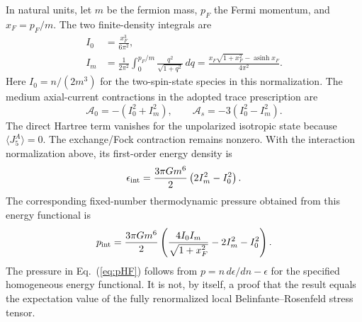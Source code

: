 \documentclass[11pt]{article}
\begin{document}
In natural units, let $m$ be the fermion mass, $p_F$ the Fermi momentum, and $x_F=p_F/m$. The two finite-density integrals are
\begin{align}
I_0&=\frac{x_F^3}{6\pi^2},\\
I_m&=\frac{1}{2\pi^2}\int_0^{p_F/m}
\frac{q^2}{\sqrt{1+q^2}}\,dq
=\frac{x_F\sqrt{1+x_F^2}-\operatorname{asinh}x_F}{4\pi^2}.
\label{eq:integrals}
\end{align}
Here $I_0=n/(2m^3)$ for the two-spin-state species in this normalization. The medium axial-current contractions in the adopted trace prescription are
\begin{equation}
\mathcal A_0=-(I_0^2+I_m^2),
\qquad
\mathcal A_s=-3(I_0^2-I_m^2).
\label{eq:axial-traces}
\end{equation}
The direct Hartree term vanishes for the unpolarized isotropic state because $\langle J_5^A\rangle=0$. The exchange/Fock contraction remains nonzero. With the interaction normalization above, its first-order energy density is
\begin{equation}
\epsilon_{\rm int}=\frac{3\pi Gm^6}{2}
\left(2I_m^2-I_0^2\right).
\label{eq:epsHF}
\end{equation}
The corresponding fixed-number thermodynamic pressure obtained from this energy functional is
\begin{equation}
p_{\rm int}=\frac{3\pi Gm^6}{2}
\left(\frac{4I_0I_m}{\sqrt{1+x_F^2}}-2I_m^2-I_0^2\right).
\label{eq:pHF}
\end{equation}
The pressure in Eq.~(\ref{eq:pHF}) follows from $p=n\,d\epsilon/dn-\epsilon$ for the specified homogeneous energy functional. It is not, by itself, a proof that the result equals the expectation value of the fully renormalized local Belinfante--Rosenfeld stress tensor.
\end{document}
